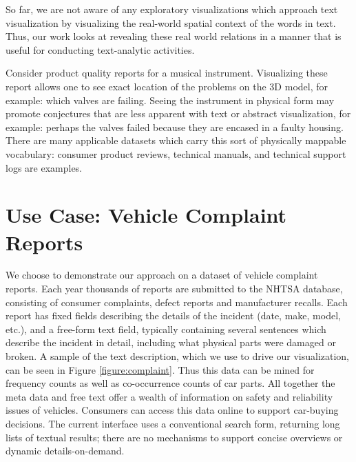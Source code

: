 So far, we are not aware of any exploratory visualizations which approach text
visualization by visualizing the real-world spatial context of the words in
text. Thus, our work looks at revealing these real world relations in a manner
that is useful for conducting text-analytic activities.

Consider product quality reports for a musical instrument. Visualizing
these report allows one to see exact location of the problems on the
3D model, for example: which valves are failing. Seeing the instrument
in physical form may promote conjectures that are less apparent
with text or abstract visualization, for example: perhaps the valves
failed because they are encased in a faulty housing. There are many
applicable datasets which carry this sort of physically mappable vocabulary:
consumer product reviews, technical manuals, and technical
support logs are examples.



\section{Use Case: Vehicle Complaint Reports}
We choose to demonstrate our approach on a dataset of vehicle complaint
reports. Each year thousands of reports are submitted to the
NHTSA database, consisting of consumer complaints, defect reports
and manufacturer recalls. Each report has fixed fields describing the
details of the incident (date, make, model, etc.), and a free-form text
field, typically containing several sentences which describe the incident
in detail, including what physical parts were damaged or broken. A sample of the
text description, which we use to drive our visualization, can be seen in Figure
\ref{figure:complaint}. Thus this data can be mined for frequency counts as
well as co-occurrence counts of car parts. All together the meta data and free
text offer a wealth of information on safety and reliability issues of
vehicles. Consumers can access this data online to support car-buying
decisions. The current interface uses a conventional search form, returning
long lists of textual results; there are no mechanisms to support
concise overviews or dynamic details-on-demand. 


 

